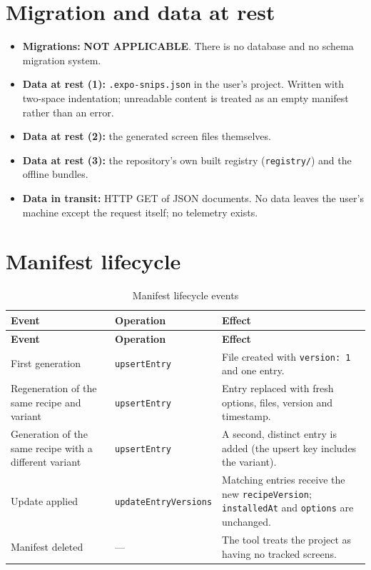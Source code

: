 \section{Migration and data at rest}

\begin{itemize}
  \item \textbf{Migrations:} \textbf{NOT APPLICABLE}. There is no database and no
        schema migration system.
  \item \textbf{Data at rest (1):} \texttt{.expo-snips.json} in the user's project.
        Written with two-space indentation; unreadable content is treated as an
        empty manifest rather than an error.
  \item \textbf{Data at rest (2):} the generated screen files themselves.
  \item \textbf{Data at rest (3):} the repository's own built registry
        (\texttt{registry/}) and the offline bundles.
  \item \textbf{Data in transit:} HTTP GET of JSON documents. No data leaves the
        user's machine except the request itself; no telemetry exists.
\end{itemize}

\section{Manifest lifecycle}

\begin{longtable}{@{}L{3.2cm}L{4.2cm}L{7cm}@{}}
\caption{Manifest lifecycle events}\\
\toprule
\textbf{Event} & \textbf{Operation} & \textbf{Effect} \\
\midrule
\endfirsthead
\toprule
\textbf{Event} & \textbf{Operation} & \textbf{Effect} \\
\midrule
\endhead
First generation & \texttt{upsertEntry} & File created with \texttt{version: 1} and one
entry. \\
Regeneration of the same recipe and variant & \texttt{upsertEntry} & Entry replaced
with fresh options, files, version and timestamp. \\
Generation of the same recipe with a different variant & \texttt{upsertEntry} &
A second, distinct entry is added (the upsert key includes the variant). \\
Update applied & \texttt{updateEntryVersions} & Matching entries receive the new
\texttt{recipeVersion}; \texttt{installedAt} and \texttt{options} are unchanged. \\
Manifest deleted & --- & The tool treats the project as having no tracked screens. \\
\bottomrule
\end{longtable}

